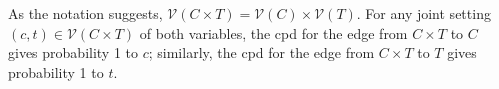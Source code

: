 \documentclass[letterpaper]{article} %
\theoremstyle{plain}
\theoremstyle{definition}
\theoremstyle{remark}
\newcommand{\vleftovers}[1]{{\color{vleftoverscolor} #1}}
\renewcommand{\vleftovers}[1]{} %
\newcommand{\V}{\mathcal V}
\begin{document}
\begin{constr}
As the notation suggests, $\V( C \times T) = \V(C) \times \V(T)$.
For any joint setting $(c,t) \in \V(C \times T)$ of both variables, the cpd for
the edge from $C \times T$ to $C$ gives probability 1 to $c$;
similarly, the cpd for the edge from $ C \times T$ to $T$ gives probability 1 to $t$.
\end{constr}

\vleftovers{
    We have stressed that edges are interpreted differently in PDGs than
    in Bayesian Networks. Readers should be aware that this approach is
    closely related to the notion of a \emph{commutative diagram}, a
    common representation in pure mathematics. For those familiar with
    them, the potential failure of a PDG to be consistent is analogous to
    the possibility that a diagram could fail to commute. 
}
\end{document}
